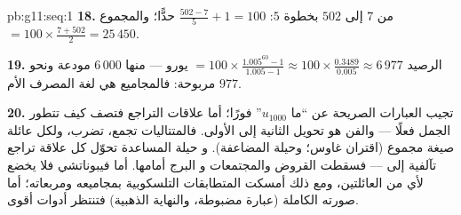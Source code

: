 \begin{solution}{pb:g11:seq:1}
\textbf{18.} من $7$ إلى $502$ بخطوة $5$:
$\frac{502 - 7}{5} + 1 = 100$ حدًّا؛ والمجموع
$= 100 \times \frac{7 + 502}{2} = 25\,450$.

\textbf{19.} الرصيد $= 100 \times \frac{1.005^{60} - 1}
{1.005 - 1} \approx 100 \times \frac{0.3489}{0.005} \approx
6\,977$ يورو --- منها $6\,000$ مودعة ونحو $977$
مربوحة: فالمجاميع  هي لغة المصرف الأم.

\textbf{20.} تجيب العبارات الصريحة عن ``ما $u_{1000}$''
فورًا؛ أما علاقات التراجع فتصف كيف تتطور الجمل فعلًا ---
والفن هو تحويل الثانية إلى الأولى. فالمتتاليات 
تجمع،  تضرب، ولكل عائلة صيغة
مجموع (اقتران غاوس؛ وحيلة المضاعفة). و
حيلة   المساعدة تحوّل كل علاقة تراجع
تآلفية إلى  --- فسقطت القروض والمجتمعات و
البرج أمامها. أما فيبوناتشي فلا يخضع لأي من العائلتين، ومع ذلك
أمسكت المتطابقات التلسكوبية بمجاميعه ومربعاته؛ أما صورته الكاملة
(عبارة مضبوطة، والنهاية الذهبية) فتنتظر أدوات أقوى.
\end{solution}
